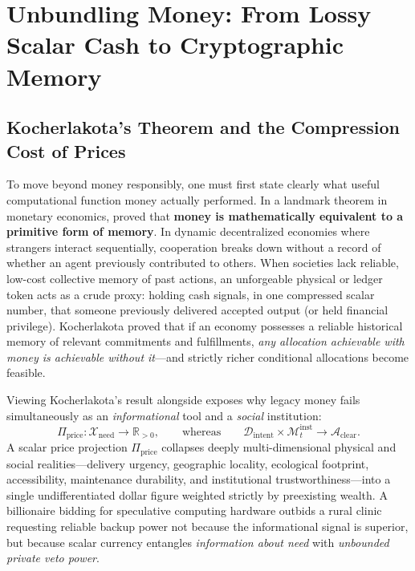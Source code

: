 \documentclass[11pt]{article}
\begin{document}
\section{Unbundling Money: From Lossy Scalar Cash to Cryptographic Memory}\label{sec:memory}

\subsection{Kocherlakota's Theorem and the Compression Cost of Prices}

To move beyond money responsibly, one must first state clearly what useful computational function money actually performed. In a landmark theorem in monetary economics, \citet{kocherlakota1998memory} proved that \textbf{money is mathematically equivalent to a primitive form of memory}. In dynamic decentralized economies where strangers interact sequentially, cooperation breaks down without a record of whether an agent previously contributed to others. When societies lack reliable, low-cost collective memory of past actions, an unforgeable physical or ledger token acts as a crude proxy: holding cash signals, in one compressed scalar number, that someone previously delivered accepted output (or held financial privilege). Kocherlakota proved that if an economy possesses a reliable historical memory of relevant commitments and fulfillments, \emph{any allocation achievable with money is achievable without it}---and strictly richer conditional allocations become feasible.

Viewing Kocherlakota's result alongside \citet{mason2026against} exposes why legacy money fails simultaneously as an \emph{informational} tool and a \emph{social} institution:
\begin{equation}
  \Pi_{\mathrm{price}} : \mathcal{X}_{\mathrm{need}} \longrightarrow \mathbb{R}_{>0}, \qquad \text{whereas} \qquad \mathcal{D}_{\mathrm{intent}} \times \mathcal{M}_{t}^{\mathrm{inst}} \longrightarrow \mathcal{A}_{\mathrm{clear}}.
  \label{eq:projection}
\end{equation}
A scalar price projection $\Pi_{\mathrm{price}}$ collapses deeply multi-dimensional physical and social realities---delivery urgency, geographic locality, ecological footprint, accessibility, maintenance durability, and institutional trustworthiness---into a single undifferentiated dollar figure weighted strictly by preexisting wealth. A billionaire bidding for speculative computing hardware outbids a rural clinic requesting reliable backup power not because the informational signal is superior, but because scalar currency entangles \emph{information about need} with \emph{unbounded private veto power}.
\end{document}
